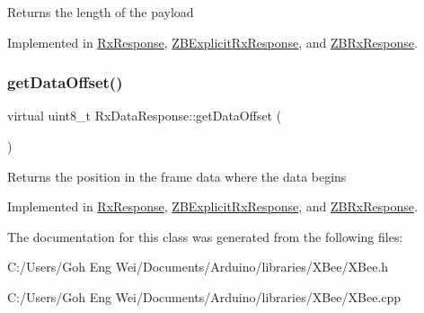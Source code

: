 Returns the length of the payload 

Implemented in \hyperlink{class_rx_response_add3478a1ce5667aad315f6a6c218011a}{Rx\+Response}, \hyperlink{class_z_b_explicit_rx_response_af0f29cd6d76215f50224547ef8201cb7}{Z\+B\+Explicit\+Rx\+Response}, and \hyperlink{class_z_b_rx_response_a9d2b73060d611bbdd581e0ceb195fd31}{Z\+B\+Rx\+Response}.

\hypertarget{class_rx_data_response_a9e4b6bf4f1bfd9ccec45d190a204f61a}{}\label{class_rx_data_response_a9e4b6bf4f1bfd9ccec45d190a204f61a} 
\subsubsection{\texorpdfstring{get\+Data\+Offset()}{getDataOffset()}}
{\footnotesize\ttfamily virtual uint8\+\_\+t Rx\+Data\+Response\+::get\+Data\+Offset (\begin{DoxyParamCaption}{ }\end{DoxyParamCaption})\hspace{0.3cm}{\ttfamily [pure virtual]}}

Returns the position in the frame data where the data begins 

Implemented in \hyperlink{class_rx_response_a37fd3ee455f2157fa3894e710e668409}{Rx\+Response}, \hyperlink{class_z_b_explicit_rx_response_aac859574ace86ba08f6abb9d865fec17}{Z\+B\+Explicit\+Rx\+Response}, and \hyperlink{class_z_b_rx_response_ad54e6ff3008f79d0ed32a78cc3d69151}{Z\+B\+Rx\+Response}.



The documentation for this class was generated from the following files\+:\begin{DoxyCompactItemize}
\item 
C\+:/\+Users/\+Goh Eng Wei/\+Documents/\+Arduino/libraries/\+X\+Bee/X\+Bee.\+h\item 
C\+:/\+Users/\+Goh Eng Wei/\+Documents/\+Arduino/libraries/\+X\+Bee/X\+Bee.\+cpp\end{DoxyCompactItemize}
